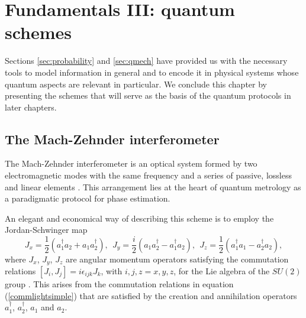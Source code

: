 \section{Fundamentals III: quantum schemes}
\label{sec:qmetrology}

Sections \ref{sec:probability} and \ref{sec:qmech} have provided us with the necessary tools to model information in general and to encode it in physical systems whose quantum aspects are relevant in particular. We conclude this chapter by presenting the schemes that will serve as the basis of the quantum protocols in later chapters.

\subsection{The Mach-Zehnder interferometer}
\label{subsec:optint}

The Mach-Zehnder interferometer is an optical system formed by two electromagnetic modes with the same frequency and a series of passive, lossless and linear elements \cite{rafal2015, yurke1986}. This arrangement lies at the heart of quantum metrology as a paradigmatic protocol for phase estimation. 

An elegant and economical way of describing this scheme is to employ the Jordan-Schwinger map \cite{yurke1986, rafal2015}
\begin{equation}
J_x = \frac{1}{2}\left(a_1^\dagger a_2 + a_1 a_2^\dagger \right), ~~ J_y = \frac{i}{2}\left(a_1 a_2^\dagger - a_1^\dagger a_2 \right), ~~ J_z = \frac{1}{2}\left(a_1^\dagger a_1 - a_2^\dagger a_2 \right),
\end{equation}
where $J_x$, $J_y$, $J_z$ are angular momentum operators satisfying the commutation relations $[J_i, J_j] = i\epsilon_{ijk}J_k$, with $i, j, z = x, y, z$, for the Lie algebra of the $SU(2)$ group \cite{yurke1986}. This arises from the commutation relations in equation (\ref{commlightsimple}) that are satisfied by the creation and annihilation operators $a_1^\dagger$, $a_2^\dagger$, $a_1$ and $a_2$.


